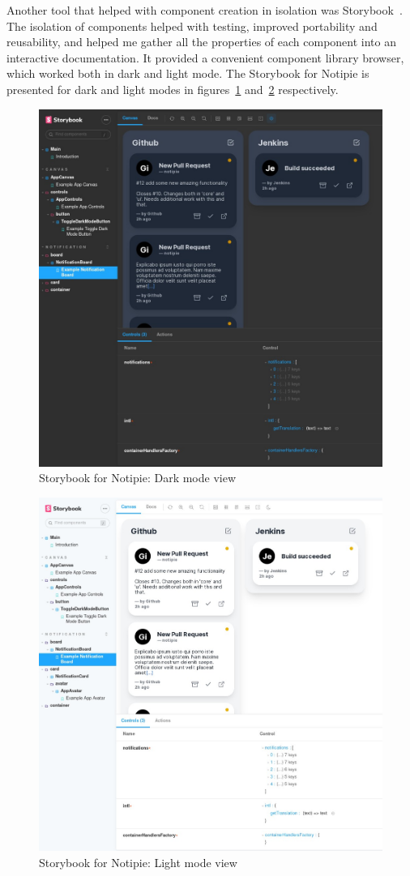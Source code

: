 Another tool that helped with
component creation in isolation
was Storybook~\cite{shilman_storybook_2022}.
The isolation of components
helped with testing,
improved portability and reusability,
and helped me gather all the properties
of each component into an interactive
documentation.
It provided a convenient component library browser,
which worked both in dark and light mode.
The Storybook for Notipie is presented
for dark and light modes in
figures~\ref{fig:storybook-dark}
and~\ref{fig:storybook-light}
respectively.

\begin{figure}[p]
  \centering
  \includegraphics[width=\linewidth,keepaspectratio]{img/storybook.jpg}
  \caption{Storybook for Notipie: Dark mode view}
  \label{fig:storybook-dark}
\end{figure}

\begin{figure}[p]
  \centering
  \includegraphics[width=\linewidth,keepaspectratio]{img/storybook_light.jpg}
  \caption{Storybook for Notipie: Light mode view}
  \label{fig:storybook-light}
\end{figure}

